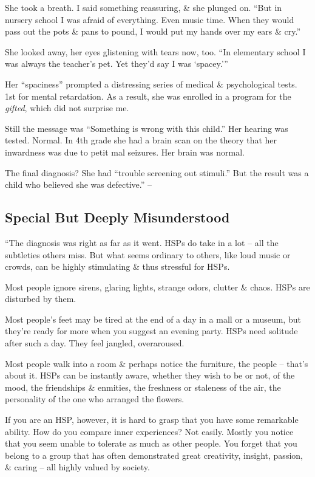 \documentclass{article}
\numberwithin{equation}{section}
\begin{document}
She took a breath. I said something reassuring, \& she plunged on. ``But in nursery school I was afraid of everything. Even music time. When they would pass out the pots \& pans to pound, I would put my hands over my ears \& cry.''

She looked away, her eyes glistening with tears now, too. ``In elementary school I was always the teacher's pet. Yet they'd say I was `spacey.'''

Her ``spaciness'' prompted a distressing series of medical \& psychological tests. 1st for mental retardation. As a result, she was enrolled in a program for the \textit{gifted}, which did not surprise me.

Still the message was ``Something is wrong with this child.'' Her hearing was tested. Normal. In 4th grade she had a brain scan on the theory that her inwardness was due to petit mal seizures. Her brain was normal.

The final diagnosis? She had ``trouble screening out stimuli.'' But the result was a child who believed she was defective.'' -- \cite[pp. 37--38]{Aron2013}

\subsection{Special But Deeply Misunderstood}
``The diagnosis was right as far as it went. HSPs do take in a lot -- all the subtleties others miss. But what seems ordinary to others, like loud music or crowds, can be highly stimulating \& thus stressful for HSPs.

Most people ignore sirens, glaring lights, strange odors, clutter \& chaos. HSPs are disturbed by them.

Most people's feet may be tired at the end of a day in a mall or a museum, but they're ready for more when you suggest an evening party. HSPs need solitude after such a day. They feel jangled, overaroused.

Most people walk into a room \& perhaps notice the furniture, the people -- that's about it. HSPs can be instantly aware, whether they wish to be or not, of the mood, the friendships \& enmities, the freshness or staleness of the air, the personality of the one who arranged the flowers.

If you are an HSP, however, it is hard to grasp that you have some remarkable ability. How do you compare inner experiences? Not easily. Mostly you notice that you seem unable to tolerate as much as other people. You forget that you belong to a group that has often demonstrated great creativity, insight, passion, \& caring -- all highly valued by society.
\end{document}
